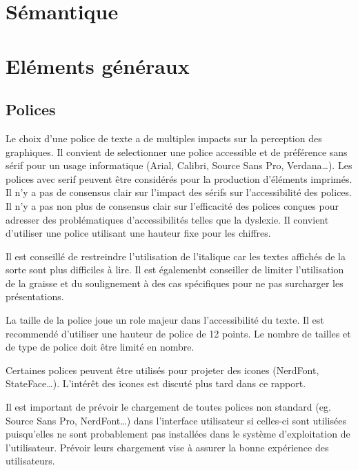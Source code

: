 \documentclass[11pt]{article}
\begin{document}
\section{Sémantique}
\label{sec:orgd8cf427}

\section{Eléments généraux}
\label{sec:org3ca2e71}
\subsection{Polices}
\label{sec:orgb13dc52}
Le choix d'une police de texte a de multiples impacts sur la perception des graphiques. Il convient de selectionner une police accessible et de préférence sans sérif pour un usage informatique (Arial, Calibri, Source Sans Pro, Verdana\ldots{}).\autocite{andreaskrauseBestPracticesData2024} Les polices avec serif peuvent être considérés pour la production d'éléments imprimés. Il n'y a pas de consensus clair sur l'impact des sérifs sur l'accessibilité des polices.\autocite{stephenfew8TableDesign2012} Il n'y a pas non plus de consensus clair sur l'efficacité des polices conçues pour adresser des problématiques d'accessibilités telles que la dyslexie. Il convient d'utiliser une police utilisant une hauteur fixe pour les chiffres.\autocite{stephenfew8TableDesign2012}

Il est conseillé de restreindre l'utilisation de l'italique car les textes affichés de la sorte sont plus difficiles à lire. Il est égalemenbt conseiller de limiter l'utilisation de la graisse et du soulignement à des cas spécifiques pour ne pas surcharger les présentations.

La taille de la police joue un role majeur dans l'accessibilité du texte. Il est recommendé d'utiliser une hauteur de police de 12 points.\autocite{andreaskrauseBestPracticesData2024} Le nombre de tailles et de type de police doit être limité en nombre.\autocite{andreaskrauseBestPracticesData2024}

Certaines polices peuvent être utilisés pour projeter des icones (NerdFont, StateFace\ldots{}).\autocite{jonathanschwabish10Qualitative2021} L'intérêt des icones est discuté plus tard dans ce rapport.

Il est important de prévoir le chargement de toutes polices non standard (eg. Source Sans Pro, NerdFont\ldots{}) dans l'interface utilisateur si celles-ci sont utilisées puisqu'elles ne sont probablement pas installées dans le système d'exploitation de l'utilisateur. Prévoir leurs chargement vise à assurer la bonne expérience des utilisateurs.
\end{document}
